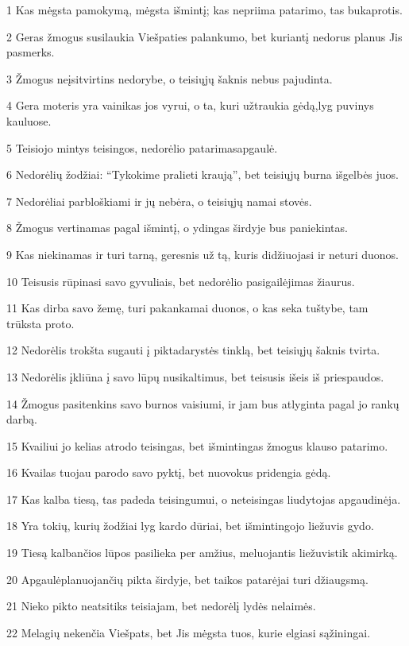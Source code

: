 \par 1 Kas mėgsta pamokymą, mėgsta išmintį; kas nepriima patarimo, tas bukaprotis. 
\par 2 Geras žmogus susilaukia Viešpaties palankumo, bet kuriantį nedorus planus Jis pasmerks. 
\par 3 Žmogus neįsitvirtins nedorybe, o teisiųjų šaknis nebus pajudinta. 
\par 4 Gera moteris yra vainikas jos vyrui, o ta, kuri užtraukia gėdą,­lyg puvinys kauluose. 
\par 5 Teisiojo mintys teisingos, nedorėlio patarimas­apgaulė. 
\par 6 Nedorėlių žodžiai: “Tykokime pralieti kraują”, bet teisiųjų burna išgelbės juos. 
\par 7 Nedorėliai parbloškiami ir jų nebėra, o teisiųjų namai stovės. 
\par 8 Žmogus vertinamas pagal išmintį, o ydingas širdyje bus paniekintas. 
\par 9 Kas niekinamas ir turi tarną, geresnis už tą, kuris didžiuojasi ir neturi duonos. 
\par 10 Teisusis rūpinasi savo gyvuliais, bet nedorėlio pasigailėjimas žiaurus. 
\par 11 Kas dirba savo žemę, turi pakankamai duonos, o kas seka tuštybe, tam trūksta proto. 
\par 12 Nedorėlis trokšta sugauti į piktadarystės tinklą, bet teisiųjų šaknis tvirta. 
\par 13 Nedorėlis įkliūna į savo lūpų nusikaltimus, bet teisusis išeis iš priespaudos. 
\par 14 Žmogus pasitenkins savo burnos vaisiumi, ir jam bus atlyginta pagal jo rankų darbą. 
\par 15 Kvailiui jo kelias atrodo teisingas, bet išmintingas žmogus klauso patarimo. 
\par 16 Kvailas tuojau parodo savo pyktį, bet nuovokus pridengia gėdą. 
\par 17 Kas kalba tiesą, tas padeda teisingumui, o neteisingas liudytojas apgaudinėja. 
\par 18 Yra tokių, kurių žodžiai lyg kardo dūriai, bet išmintingojo liežuvis gydo. 
\par 19 Tiesą kalbančios lūpos pasilieka per amžius, meluojantis liežuvis­tik akimirką. 
\par 20 Apgaulė­planuojančių pikta širdyje, bet taikos patarėjai turi džiaugsmą. 
\par 21 Nieko pikto neatsitiks teisiajam, bet nedorėlį lydės nelaimės. 
\par 22 Melagių nekenčia Viešpats, bet Jis mėgsta tuos, kurie elgiasi sąžiningai. 
